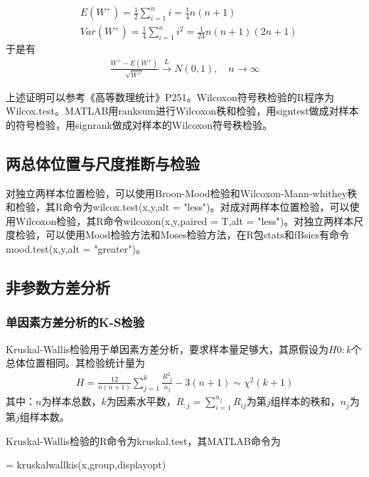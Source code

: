             \begin{align*}
            &E(W^+) = \frac{1}{2} \sum_{i=1}^n i =\frac{1}{4}n(n+1) \\
            &Var(W^+) = \frac{1}{4}\sum_{i=1}^n i^2 = \frac{1}{24}n(n+1)(2n+1)
            \end{align*}
            于是有
            \begin{align*}
            \frac{W^+ - E(W^+)}{\sqrt{W^+}} \xrightarrow{L} N(0,1) ,\quad n\rightarrow \infty
            \end{align*}
            \par
            上述证明可以参考《高等数理统计》P251。Wilcoxon符号秩检验的R程序为Wilcox.test。MATLAB用ranksum进行Wilcoxon秩和检验，用signtest做成对样本的符号检验，用signrank做成对样本的Wilcoxon符号秩检验。
    \subsection{两总体位置与尺度推断与检验}
        \par
        对独立两样本位置检验，可以使用Broon-Mood检验和Wilcoxon-Mann-whithey秩和检验，其R命令为wilcox.test(x,y,alt = "less")。对成对两样本位置检验，可以使用Wilcoxon检验，其R命令wilcoxon(x,y,paired = T,alt = "less")。对独立两样本尺度检验，可以使用Mood检验方法和Moses检验方法，在R包stats和fBsics有命令mood.test(x,y,alt = "greater")。
    \subsection{非参数方差分析}
        \subsubsection{单因素方差分析的K-S检验}
            \par
            Kruskal-Wallis检验用于单因素方差分析，要求样本量足够大，其原假设为$H0:k$个总体位置相同。其检验统计量为
            \begin{align*}
            H = \frac{12}{n(n+1)} \sum_{j = 1}^k \frac{R_{:j}^2}{n_j} - 3(n+1) \sim \chi^2(k+1)
            \end{align*}
            其中：$n$为样本总数，$k$为因素水平数，$R_{:j} = \sum_{i=1}^{n_j}R_{ij}$为第$j$组样本的秩和，$n_j$为第$j$组样本数。
            \par
            Kruskal-Wallis检验的R命令为kruskal.test，其MATLAB命令为
            \par
            [p,table,stats] = kruskalwallkis(x,group,displayopt)

